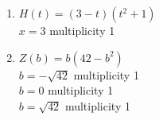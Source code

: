 \documentclass{ximera}
\begin{document}
\begin{enumerate}
\setcounter{enumi}{\value{HW}}

\item $H(t) = (3-t)\left(t^2+1\right)$\\
$x =3$ multiplicity 1\\

%

\vfill


\item $Z(b) = b(42 - b^{2})$\\
$b = -\sqrt{42}$ multiplicity 1\\
$b = 0$ multiplicity 1\\
$b = \sqrt{42}$ multiplicity 1\\

%

\setcounter{HW}{\value{enumi}}
\end{enumerate}

\pagebreak
\end{document}
